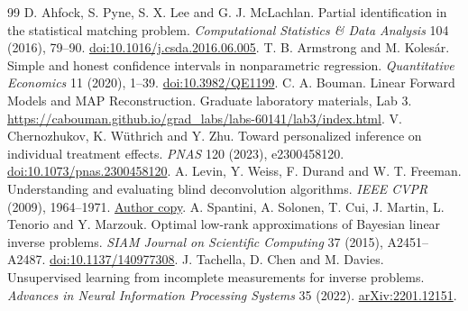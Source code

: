 \documentclass[11pt]{article}
\begin{document}
\begin{thebibliography}{99}
 D. Ahfock, S. Pyne, S. X. Lee and G. J. McLachlan. Partial identification in the statistical matching problem. \emph{Computational Statistics \& Data Analysis} 104 (2016), 79--90. \href{https://doi.org/10.1016/j.csda.2016.06.005}{doi:10.1016/j.csda.2016.06.005}.
 T. B. Armstrong and M. Koles\'ar. Simple and honest confidence intervals in nonparametric regression. \emph{Quantitative Economics} 11 (2020), 1--39. \href{https://doi.org/10.3982/QE1199}{doi:10.3982/QE1199}.
 C. A. Bouman. Linear Forward Models and MAP Reconstruction. Graduate laboratory materials, Lab 3. \url{https://cabouman.github.io/grad_labs/labs-60141/lab3/index.html}.
 V. Chernozhukov, K. W\"uthrich and Y. Zhu. Toward personalized inference on individual treatment effects. \emph{PNAS} 120 (2023), e2300458120. \href{https://doi.org/10.1073/pnas.2300458120}{doi:10.1073/pnas.2300458120}.
 A. Levin, Y. Weiss, F. Durand and W. T. Freeman. Understanding and evaluating blind deconvolution algorithms. \emph{IEEE CVPR} (2009), 1964--1971. \href{https://people.csail.mit.edu/billf/papers/deconvLevinEtalCVPR09.pdf}{Author copy}.
 A. Spantini, A. Solonen, T. Cui, J. Martin, L. Tenorio and Y. Marzouk. Optimal low-rank approximations of Bayesian linear inverse problems. \emph{SIAM Journal on Scientific Computing} 37 (2015), A2451--A2487. \href{https://doi.org/10.1137/140977308}{doi:10.1137/140977308}.
 J. Tachella, D. Chen and M. Davies. Unsupervised learning from incomplete measurements for inverse problems. \emph{Advances in Neural Information Processing Systems} 35 (2022). \href{https://arxiv.org/abs/2201.12151}{arXiv:2201.12151}.
\end{thebibliography}
\end{document}
